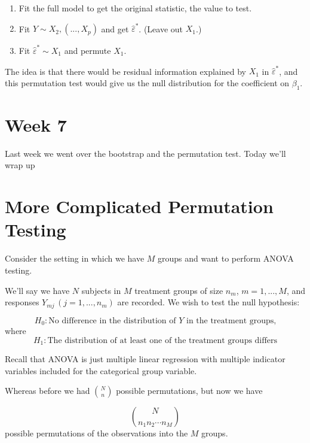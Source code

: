 \documentclass[
  letterpaper,
  DIV=11,
  numbers=noendperiod]{scrreport}
\providecommand{\tightlist}{%
  \setlength{\itemsep}{0pt}\setlength{\parskip}{0pt}}\usepackage{longtable,booktabs,array}
\begin{document}
\begin{enumerate}
\def\labelenumi{\arabic{enumi}.}
\tightlist
\item
  Fit the full model to get the original statistic, the value to test.
\item
  Fit \(Y \sim X_2, (..., X_p)\) and get \(\hat \varepsilon^*\). (Leave
  out \(X_1\).)
\item
  Fit \(\hat \varepsilon^* \sim X_1\) and permute \(X_1\).
\end{enumerate}

The idea is that there would be residual information explained by
\(X_1\) in \(\hat \varepsilon^*\), and this permutation test would give
us the null distribution for the coefficient on \(\beta_1\).


\hypertarget{week-7}{%
\chapter{Week 7}\label{week-7}}

Last week we went over the bootstrap and the permutation test. Today
we'll wrap up


\hypertarget{more-complicated-permutation-testing}{%
\chapter{More Complicated Permutation
Testing}\label{more-complicated-permutation-testing}}

Consider the setting in which we have \(M\) groups and want to perform
ANOVA testing.

We'll say we have \(N\) subjects in \(M\) treatment groups of size
\(n_m\), \(m=1, ..., M\), and responses \(Y_{mj} \, (j = 1,...,n_m)\)
are recorded. We wish to test the null hypothesis:

\[H_0 \colon \text{No difference in the distribution of $Y$ in the treatment groups,}
\] where \[
H_1 \colon \text{The distribution of at least one of the treatment groups differs}
\]

Recall that ANOVA is just multiple linear regression with multiple
indicator variables included for the categorical group variable.

Whereas before we had \({ N \choose n }\) possible permutations, but now
we have

\[{ N \choose n_1 n_2 \cdots n_M}
\] possible permutations of the observations into the \(M\) groups.
\end{document}
